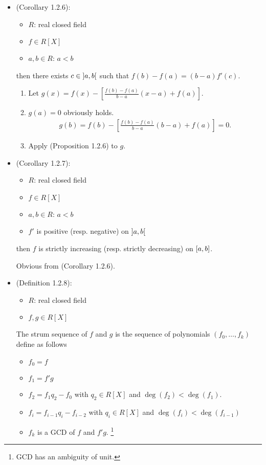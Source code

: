 \documentclass[9pt]{ltjsarticle}
\begin{document}
\begin{itemize}
\begin{enumerate}
  \end{enumerate}
  \item
  (Corollary 1.2.6):
  \begin{itemize}
    \item $R$: real closed field
    \item $f\in R[X]$
    \item $a,b\in R$: $a<b$
  \end{itemize}
  then there exists $c\in \left] a,b \right[$ such that
  $f(b)-f(a) = (b-a)f'(c)$.
  \pf
  \begin{enumerate}
    \item Let $g(x) = f(x) - [\frac{f(b)-f(a)}{b-a}(x-a)+f(a)]$.
    \item
    $g(a)=0$ obviously holds.
    \begin{align}
      g(b)
      =
      f(b) - [\frac{f(b)-f(a)}{b-a}(b-a)+f(a)] = 0.
    \end{align}
    \item
    Apply (Proposition 1.2.6) to $g$.
  \end{enumerate}
  \item
  (Corollary 1.2.7):
  \begin{itemize}
    \item $R$: real closed field
    \item $f\in R[X]$
    \item $a,b \in R$: $a<b$
    \item $f'$ is positive (resp. negative) on $\left] a,b \right[$
  \end{itemize}
  then $f$ is strictly increasing (resp. strictly decreasing) on $\left[ a,b \right]$.

  \pf
  Obvious from (Corollary 1.2.6).
  \item
  (Definition 1.2.8):
  \begin{itemize}
    \item $R$: real closed field
    \item $f,g \in R[X]$
  \end{itemize}
  The strum sequence of $f$ and $g$ is the sequence of
  polynomials $(f_0,\dots,f_k)$ define as follows
  \begin{itemize}
    \item $f_0 = f$
    \item $f_1 = f'g$
    \item $f_2 = f_1 q_2 - f_0$ with $q_2 \in R[X]$ and $\deg(f_2)  < \deg(f_1)$.
    \item $f_i = f_{i-1} q_i - f_{i-2}$ with $q_i \in R[X]$ and $\deg(f_i) < \deg(f_{i-1})$
    \item $f_k$ is a GCD of $f$ and $f'g$. \footnote{GCD has an ambiguity of unit.}
  \end{itemize}


\end{itemize}
\end{document}
